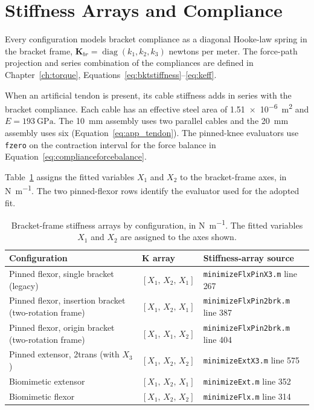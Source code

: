 \section{Stiffness Arrays and Compliance}

Every configuration models bracket compliance as a diagonal Hooke-law spring in the bracket frame, $\mathbf{K}_{br} = \operatorname{diag}(k_{1}, k_{2}, k_{3})$ newtons per meter. The force-path projection and series combination of the compliances are defined in Chapter~\ref{ch:torque}, Equations~\eqref{eq:bktstiffness}--\eqref{eq:keff}.

When an artificial tendon is present, its cable stiffness adds in series with the bracket compliance. Each cable has an effective steel area of \qty{1.51e-6}{\square\meter} and $E=\qty{193}{\giga\pascal}$. The \qty{10}{\mm} assembly uses two parallel cables and the \qty{20}{\mm} assembly uses six (Equation~\eqref{eq:app_tendon}). The pinned-knee evaluators use \texttt{fzero} on the contraction interval for the force balance in Equation~\eqref{eq:complianceforcebalance}.

Table~\ref{tab:app_stiffness_arrays} assigns the fitted variables $X_1$ and $X_2$ to the bracket-frame axes, in \unit{\newton\per\meter}. The two pinned-flexor rows identify the evaluator used for the adopted fit.

\begin{table}[htbp]
\caption{Bracket-frame stiffness arrays by configuration, in \unit{\newton\per\meter}. The fitted variables $X_1$ and $X_2$ are assigned to the axes shown.}
\label{tab:app_stiffness_arrays}
\begin{tabularx}{\textwidth}{@{}>{\raggedright\arraybackslash}p{}p{}>{\raggedright\arraybackslash}X@{}}
\toprule
\textbf{Configuration} & $\boldsymbol{K}$ array & \textbf{Stiffness-array source} \\
\midrule
Pinned flexor, single bracket (legacy)       & $[X_{1},\,X_{2},\,X_{1}]$ & \nolinkurl{minimizeFlxPinX3.m} line 267 \\
Pinned flexor, insertion bracket (two-rotation frame)    & $[X_{1},\,X_{2},\,X_{1}]$ & \nolinkurl{minimizeFlxPin2brk.m} line 387 \\
Pinned flexor, origin bracket (two-rotation frame) & $[X_{1},\,X_{1},\,X_{2}]$ & \nolinkurl{minimizeFlxPin2brk.m} line 404 \\
Pinned extensor, 2trans (with $X_{3}$)      & $[X_{1},\,X_{2},\,X_{2}]$ & \nolinkurl{minimizeExtX3.m} line 575 \\
Biomimetic extensor                 & $[X_{1},\,X_{2},\,X_{1}]$ & \nolinkurl{minimizeExt.m} line 352 \\
Biomimetic flexor                   & $[X_{1},\,X_{2},\,X_{2}]$ & \nolinkurl{minimizeFlx.m} line 314 \\
\bottomrule
\end{tabularx}
\end{table}

